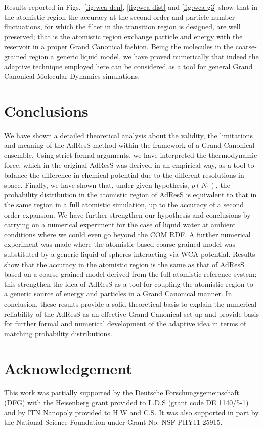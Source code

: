 \documentclass[aip,jcp,a4paper,reprint,onecolumn]{revtex4-1}
\begin{document}
Results reported in Figs.~\ref{fig:wca-den}, \ref{fig:wca-dist} and \ref{fig:wca-g3} show that in the atomistic region the accuracy at the second order and particle number fluctuations, for which the filter in the transition region is designed, are well preserved; that is the atomistic region exchange particle and energy with the reservoir in a proper Grand Canonical fashion. Being the molecules in the coarse-grained region a generic liquid model, we have proved numerically that indeed the adaptive technique employed here can be considered as a tool for general Grand Canonical Molecular Dynamics simulations.  


\section{Conclusions}
We have shown a detailed theoretical analysis about the validity, the limitations and meaning of the AdResS method within the framework of a Grand Canonical ensemble. Using strict formal arguments, we have interpreted the thermodynamic force, which in the original AdResS was derived in an empirical way, as a tool to balance the difference in chemical potential due to the different resolutions in space. Finally, we have shown that, under given hypothesis, $p(N_{1})$, the probability distribution in the atomistic region of AdResS is equivalent to that in the same region in a full atomistic simulation, up to the accuracy of a second order expansion. We have further strengthen our hypothesis and conclusions by carrying on a numerical experiment for the case of liquid water at ambient conditions where we could even go beyond the COM RDF. 
A further numerical experiment was made where the atomistic-based coarse-grained model was substituted by a generic liquid of spheres interacting via WCA potential. Results show that the accuracy in the atomistic region is the same as that of AdResS based on a coarse-grained model derived from the full atomistic reference system; this strengthen the idea of AdResS as a tool for coupling the atomistic region to a generic source of energy and particles in a Grand Canonical manner.
In conclusion, these results provide a solid theoretical basis to explain the numerical reliability of the AdResS as an effective Grand Canonical set up and provide basis for further formal and numerical development of the adaptive idea in terms of matching probability distributions.


\section*{Acknowledgement}
This work was partially supported by the Deutsche Forschungsgemeinschaft (DFG) with the Heisenberg grant provided to L.D.S (grant code DE 1140/5-1) and by ITN Nanopoly provided to H.W and C.S.
It was also supported in part by the National Science Foundation under Grant No. NSF PHY11-25915.
\end{document}
